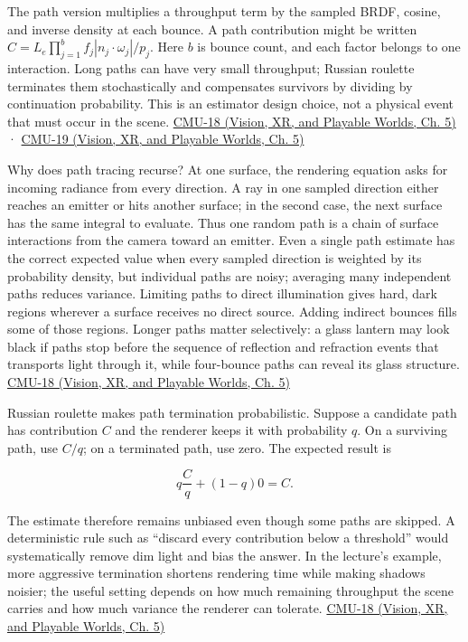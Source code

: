 The path version multiplies a throughput term by the sampled BRDF, cosine, and inverse density at each bounce. A path contribution might be written \(C= L_e\prod_{j=1}^b f_j|n_j\cdot\omega_j|/p_j\). Here \(b\) is bounce count, and each factor belongs to one interaction. Long paths can have very small throughput; Russian roulette terminates them stochastically and compensates survivors by dividing by continuation probability. This is an estimator design choice, not a physical event that must occur in the scene. \href{../07-Vision-XR-and-Playable-Worlds/main.pdf\#nameddest=04-visual-computing-ii-ch036-cmu-18---monte-carlo-rendering}{CMU-18 (Vision, XR, and Playable Worlds, Ch. 5)} · \href{../07-Vision-XR-and-Playable-Worlds/main.pdf\#nameddest=04-visual-computing-ii-ch036-cmu-19---variance-reduction}{CMU-19 (Vision, XR, and Playable Worlds, Ch. 5)}

Why does path tracing recurse? At one surface, the rendering equation asks for incoming radiance from every direction. A ray in one sampled direction either reaches an emitter or hits another surface; in the second case, the next surface has the same integral to evaluate. Thus one random path is a chain of surface interactions from the camera toward an emitter. Even a single path estimate has the correct expected value when every sampled direction is weighted by its probability density, but individual paths are noisy; averaging many independent paths reduces variance. Limiting paths to direct illumination gives hard, dark regions wherever a surface receives no direct source. Adding indirect bounces fills some of those regions. Longer paths matter selectively: a glass lantern may look black if paths stop before the sequence of reflection and refraction events that transports light through it, while four-bounce paths can reveal its glass structure. \href{../07-Vision-XR-and-Playable-Worlds/main.pdf\#nameddest=04-visual-computing-ii-ch036-cmu-18---monte-carlo-rendering}{CMU-18 (Vision, XR, and Playable Worlds, Ch. 5)}

Russian roulette makes path termination probabilistic. Suppose a candidate path has contribution \(C\) and the renderer keeps it with probability \(q\). On a surviving path, use \(C/q\); on a terminated path, use zero. The expected result is

\[
q\frac{C}{q}+(1-q)0=C.
\]

The estimate therefore remains unbiased even though some paths are skipped. A deterministic rule such as ``discard every contribution below a threshold'' would systematically remove dim light and bias the answer. In the lecture's example, more aggressive termination shortens rendering time while making shadows noisier; the useful setting depends on how much remaining throughput the scene carries and how much variance the renderer can tolerate. \href{../07-Vision-XR-and-Playable-Worlds/main.pdf\#nameddest=04-visual-computing-ii-ch036-cmu-18---monte-carlo-rendering}{CMU-18 (Vision, XR, and Playable Worlds, Ch. 5)}

